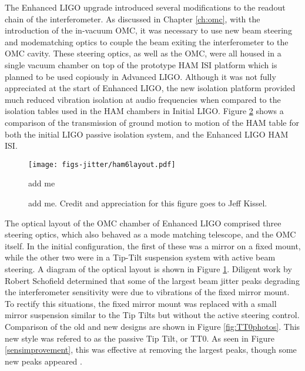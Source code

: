 The Enhanced LIGO upgrade introduced several modifications to the readout chain of the interferometer. %
As discussed in Chapter \ref{ch:omc}, with the introduction of the in-vacuum OMC, it was necessary to use new beam steering and modematching optics to couple the beam exiting the interferometer to the OMC cavity. %
These steering optics, as well as the OMC, were all housed in a single vacuum chamber on top of the prototype HAM ISI platform which is planned to be used copiously in Advanced LIGO. %
Although it was not fully appreciated at the start of Enhanced LIGO, the new isolation platform provided much reduced vibration isolation at audio frequencies when compared to the isolation tables used in the HAM chambers in Initial LIGO. %
Figure \ref{fig:hamtransmission} shows a comparison of the transmission of ground motion to motion of the HAM table for both the initial LIGO passive isolation system, and the Enhanced LIGO HAM ISI.

\begin{figure}
  \begin{center}
  \leavevmode
  \texttt{[image: figs-jitter/ham6layout.pdf]}
  \end{center}
  \caption[add me]{add me }
  \label{fig:ham6layout}
\end{figure}

\begin{figure}
  \begin{center}
  \leavevmode
  \end{center}
  \caption[add me]{add me. Credit and appreciation for this figure goes to Jeff Kissel.}
  \label{fig:hamtransmission}
\end{figure}

The optical layout of the OMC chamber of Enhanced LIGO comprised three steering optics, which also behaved as a mode matching telescope, and the OMC itself. %
In the initial configuration, the first of these was a mirror on a fixed mount, while the other two were in a Tip-Tilt suspension system with active beam steering. %
A diagram of the optical layout is shown in Figure \ref{fig:ham6layout}. %
Diligent work by Robert Schofield determined that some of the largest beam jitter peaks degrading the interferometer sensitivity were due to vibrations of the fixed mirror mount. To rectify this situations, the fixed mirror mount was replaced with a small mirror suspension similar to the Tip Tilts but without the active steering control. %
Comparison of the old and new designs are shown in Figure \ref{fig:TT0photos}. %
This new style was refered to as the passive Tip Tilt, or TT0. %
As seen in Figure \ref{sensimprovement}, this was effective at removing the largest peaks, though some new peaks appeared .

